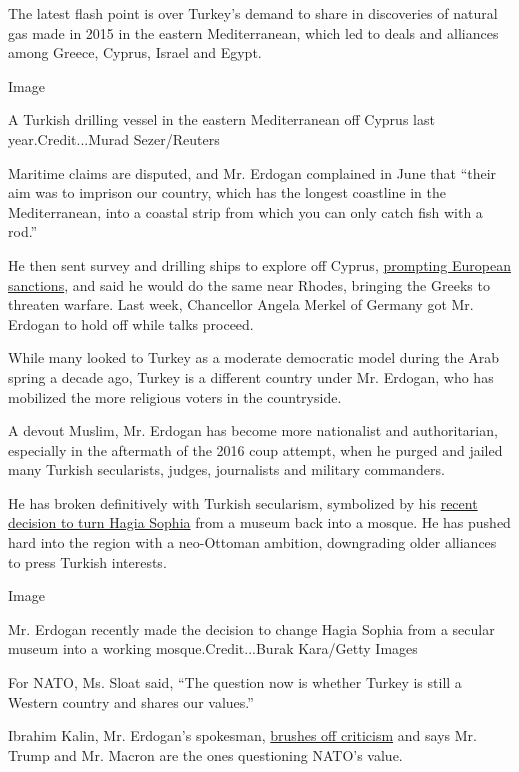 The latest flash point is over Turkey's demand to share in discoveries
of natural gas made in 2015 in the eastern Mediterranean, which led to
deals and alliances among Greece, Cyprus, Israel and Egypt.

Image

A Turkish drilling vessel in the eastern Mediterranean off Cyprus last
year.Credit...Murad Sezer/Reuters

Maritime claims are disputed, and Mr. Erdogan complained in June that
``their aim was to imprison our country, which has the longest coastline
in the Mediterranean, into a coastal strip from which you can only catch
fish with a rod.''

He then sent survey and drilling ships to explore off Cyprus,
\href{https://www.nytimes.com/2019/07/15/world/europe/eu-turkey-cyprus.html}{prompting
European sanctions}, and said he would do the same near Rhodes, bringing
the Greeks to threaten warfare. Last week, Chancellor Angela Merkel of
Germany got Mr. Erdogan to hold off while talks proceed.

While many looked to Turkey as a moderate democratic model during the
Arab spring a decade ago, Turkey is a different country under Mr.
Erdogan, who has mobilized the more religious voters in the countryside.

A devout Muslim, Mr. Erdogan has become more nationalist and
authoritarian, especially in the aftermath of the 2016 coup attempt,
when he purged and jailed many Turkish secularists, judges, journalists
and military commanders.

He has broken definitively with Turkish secularism, symbolized by his
\href{https://www.nytimes.com/2020/07/24/world/europe/turkey-hagia-sophia-mosque-prayers.html?searchResultPosition=3}{recent
decision to turn Hagia Sophia} from a museum back into a mosque. He has
pushed hard into the region with a neo-Ottoman ambition, downgrading
older alliances to press Turkish interests.

Image

Mr. Erdogan recently made the decision to change Hagia Sophia from a
secular museum into a working mosque.Credit...Burak Kara/Getty Images

For NATO, Ms. Sloat said, ``The question now is whether Turkey is still
a Western country and shares our values.''

Ibrahim Kalin, Mr. Erdogan's spokesman,
\href{http://www.epc.eu/en/past-events/Turkish-foreign-policy-in-an-age-of-uncertainty~35d928}{brushes
off criticism} and says Mr. Trump and Mr. Macron are the ones
questioning NATO's value.

